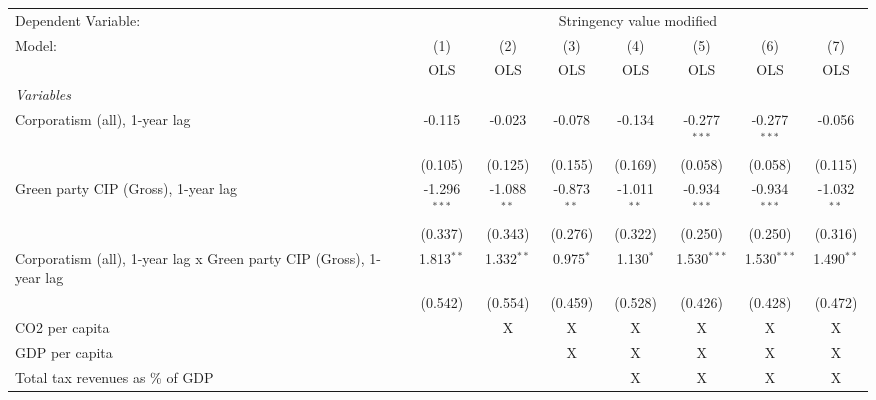 
\begingroup
\centering
\begin{tabular}{lccccccc}
   \toprule
   Dependent Variable: & \multicolumn{7}{c}{Stringency value modified}\\
   Model:                                                              & (1)            & (2)           & (3)           & (4)           & (5)            & (6)            & (7)\\  
                                                                       &  OLS           & OLS           & OLS           & OLS           & OLS            & OLS            & OLS\\  
   \midrule
   \emph{Variables}\\
   Corporatism (all), 1-year lag                                       & -0.115         & -0.023        & -0.078        & -0.134        & -0.277$^{***}$ & -0.277$^{***}$ & -0.056\\   
                                                                       & (0.105)        & (0.125)       & (0.155)       & (0.169)       & (0.058)        & (0.058)        & (0.115)\\   
   Green party CIP (Gross), 1-year lag                                 & -1.296$^{***}$ & -1.088$^{**}$ & -0.873$^{**}$ & -1.011$^{**}$ & -0.934$^{***}$ & -0.934$^{***}$ & -1.032$^{**}$\\   
                                                                       & (0.337)        & (0.343)       & (0.276)       & (0.322)       & (0.250)        & (0.250)        & (0.316)\\   
   Corporatism (all), 1-year lag x Green party CIP (Gross), 1-year lag & 1.813$^{**}$   & 1.332$^{**}$  & 0.975$^{*}$   & 1.130$^{*}$   & 1.530$^{***}$  & 1.530$^{***}$  & 1.490$^{**}$\\   
                                                                       & (0.542)        & (0.554)       & (0.459)       & (0.528)       & (0.426)        & (0.428)        & (0.472)\\   
   CO2 per capita                                                      &                & X             & X             & X             & X              & X              & X\\  
   GDP per capita                                                      &                &               & X             & X             & X              & X              & X\\  
   Total tax revenues as \% of GDP                                     &                &               &               & X             & X              & X              & X\\  

\end{tabular}
